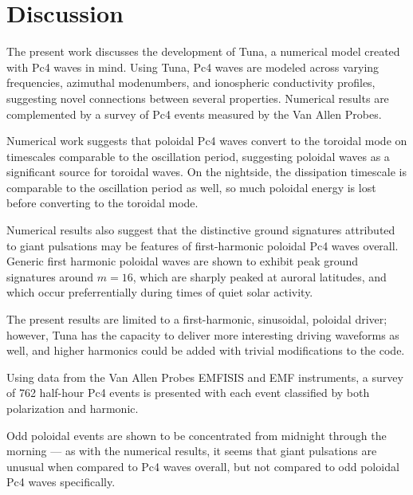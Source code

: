 \documentclass[draft,linenumbers]{agujournal}
\begin{document}


\section{Discussion}

The present work discusses the development of Tuna, a numerical model created with Pc4 waves in mind. Using Tuna, Pc4 waves are modeled across varying frequencies, azimuthal modenumbers, and ionospheric conductivity profiles, suggesting novel connections between several properties. Numerical results are complemented by a survey of Pc4 events measured by the Van Allen Probes.

Numerical work suggests that poloidal Pc4 waves convert to the toroidal mode on timescales comparable to the oscillation period, suggesting poloidal waves as a significant source for toroidal waves. On the nightside, the dissipation timescale is comparable to the oscillation period as well, so much poloidal energy is lost before converting to the toroidal mode.

Numerical results also suggest that the distinctive ground signatures attributed to giant pulsations may be features of first-harmonic poloidal Pc4 waves overall. Generic first harmonic poloidal waves are shown to exhibit peak ground signatures around ${m = 16}$, which are sharply peaked at auroral latitudes, and which occur preferrentially during times of quiet solar activity.

The present results are limited to a first-harmonic, sinusoidal, poloidal driver; however, Tuna has the capacity to deliver more interesting driving waveforms as well, and higher harmonics could be added with trivial modifications to the code.


Using data from the Van Allen Probes EMFISIS and EMF instruments, a survey of 762 half-hour Pc4 events is presented with each event classified by both polarization and harmonic.

Odd poloidal events are shown to be concentrated from midnight through the morning --- as with the numerical results, it seems that giant pulsations are unusual when compared to Pc4 waves overall, but not compared to odd poloidal Pc4 waves specifically.
\end{document}
